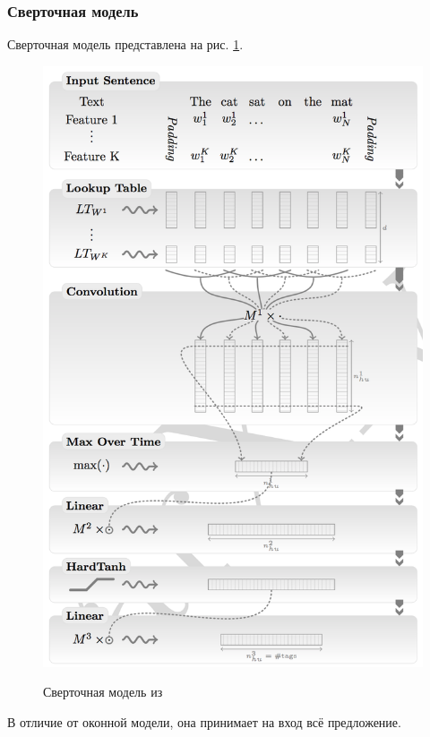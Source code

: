   \subsubsection{Сверточная модель}  \label{subsubsection:conv}
  Сверточная модель представлена на рис. \ref{figure:conv_net}.
  \begin{figure}[!h]
    \centering
    \caption{Сверточная модель из \citep{collobert2011natural}}
    \includegraphics[scale=0.8]{figures/sentence-diagram.png}
    \label{figure:conv_net}
  \end{figure}

  В отличие от оконной модели, она принимает на вход всё предложение.

